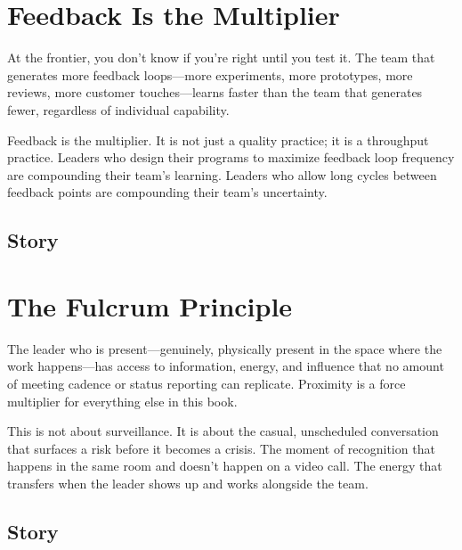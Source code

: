 \section{Feedback Is the Multiplier}


At the frontier, you don't know if you're right until you test it. The team that
generates more feedback loops---more experiments, more prototypes, more reviews,
more customer touches---learns faster than the team that generates fewer,
regardless of individual capability.

Feedback is the multiplier. It is not just a quality practice; it is a throughput
practice. Leaders who design their programs to maximize feedback loop frequency
are compounding their team's learning. Leaders who allow long cycles between
feedback points are compounding their team's uncertainty.

\subsection{Story}

\section{The Fulcrum Principle}


The leader who is present---genuinely, physically present in the space where
the work happens---has access to information, energy, and influence that no
amount of meeting cadence or status reporting can replicate. Proximity is a
force multiplier for everything else in this book.

This is not about surveillance. It is about the casual, unscheduled conversation
that surfaces a risk before it becomes a crisis. The moment of recognition that
happens in the same room and doesn't happen on a video call. The energy that
transfers when the leader shows up and works alongside the team.

\subsection{Story}


